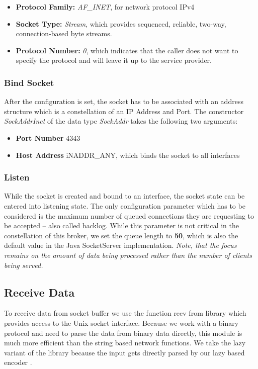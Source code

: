 \begin{itemize}
    \item {\bf Protocol Family:} \textit{AF\_INET}, for network protocol IPv4
    \item {\bf Socket Type:} \textit{Stream}, which provides sequenced, reliable, two-way, connection-based byte streams.
    \item {\bf Protocol Number:} \textit{0}, which indicates that the caller does not want to specify the protocol and will leave it up to the service provider.
\end{itemize}


\subsubsection{Bind Socket}

After the configuration is set, the socket has to be associated with an address
structure which is a constellation of an IP Address and Port. The constructor
\textit{SockAddrInet} of the data type \textit{SockAddr} takes the following
two arguments:

\begin{itemize}
    \item {\bf Port Number} 4343
    \item {\bf Host Address} iNADDR\_ANY, which binds the socket to all interfaces
\end{itemize}


\subsubsection{Listen}

While the socket is created and bound to an interface, the socket state can be
entered into listening state. The only configuration parameter which has to be
considered is the maximum number of queued connections they are requesting to
be accepted -- also called backlog. While this parameter is not critical in the
constellation of this broker, we set the queue length to \textbf{50}, which is
also the default value in the Java SocketServer implementation. \textit{Note,
that the focus remains on the amount of data being processed rather than the
number of clients being served.}

\subsection{Receive Data}
\label{sec:impl-broker-socket-receive}
To receive data from socket buffer we use the function recv from
library which provides access to the Unix socket interface. Because we work
with a binary protocol and need to parse the data from binary data directly,
this module is much more efficient than the string based network functions. We
take the lazy variant of the library because the input gets directly parsed by
our lazy based encoder .

